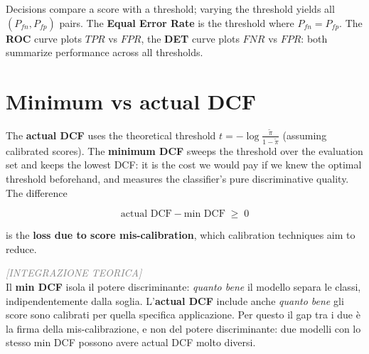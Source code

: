 Decisions compare a score with a threshold; varying the threshold yields all $(P_{fn}, P_{fp})$ pairs. The \textbf{Equal Error Rate} is the threshold where $P_{fn}=P_{fp}$. The \textbf{ROC} curve plots $TPR$ vs $FPR$, the \textbf{DET} curve plots $FNR$ vs $FPR$: both summarize performance across all thresholds.

\section*{Minimum vs actual DCF}

The \textbf{actual DCF} uses the theoretical threshold $t=-\log\frac{\tilde{\pi}}{1-\tilde{\pi}}$ (assuming calibrated scores). The \textbf{minimum DCF} sweeps the threshold over the evaluation set and keeps the lowest DCF: it is the cost we would pay if we knew the optimal threshold beforehand, and measures the classifier's pure discriminative quality. The difference

$$\text{actual DCF} - \text{min DCF} \;\geq\; 0$$

is the \textbf{loss due to score mis-calibration}, which calibration techniques aim to reduce.

\begin{tcolorbox}[colframe=blue!70!black, colback=white, sharp corners=southwest, left=2mm, boxrule=1pt, enhanced, breakable]
\textcolor{gray}{\footnotesize\textit{[INTEGRAZIONE TEORICA]}}\\
Il \textbf{min DCF} isola il potere discriminante: \emph{quanto bene} il modello separa le classi, indipendentemente dalla soglia. L'\textbf{actual DCF} include anche \emph{quanto bene} gli score sono calibrati per quella specifica applicazione. Per questo il gap tra i due è la firma della mis-calibrazione, e non del potere discriminante: due modelli con lo stesso min DCF possono avere actual DCF molto diversi.
\end{tcolorbox}
